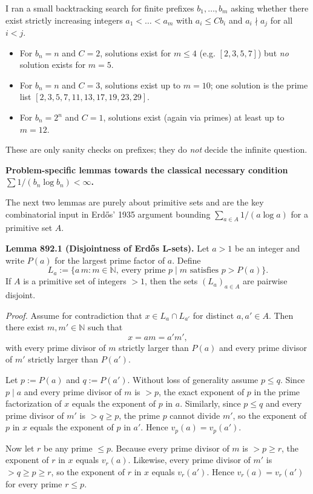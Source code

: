 I ran a small backtracking search for finite prefixes $b_1,\dots,b_m$ asking
whether there exist strictly increasing integers $a_1<\dots<a_m$ with
$a_i\le C b_i$ and $a_i\nmid a_j$ for all $i<j$.

\begin{itemize}
\item For $b_n=n$ and $C=2$, solutions exist for $m\le 4$ (e.g.
$[2,3,5,7]$) but \emph{no} solution exists for $m=5$.
\item For $b_n=n$ and $C=3$, solutions exist up to $m=10$;
one solution is the prime list $[2,3,5,7,11,13,17,19,23,29]$.
\item For $b_n=2^n$ and $C=1$, solutions exist (again via primes) at least up to
$m=12$.
\end{itemize}

These are only sanity checks on prefixes; they do \emph{not} decide the infinite
question.

\medskip
\textbf{Problem-specific lemmas towards the classical necessary condition
$\sum 1/(b_n\log b_n)<\infty$.}

The next two lemmas are purely about primitive sets and are the key combinatorial
input in Erd\H{o}s’ 1935 argument bounding
$\sum_{a\in A} 1/(a\log a)$ for a primitive set $A$.

\medskip
\noindent\textbf{Lemma 892.1 (Disjointness of Erd\H{o}s L-sets).}
Let $a>1$ be an integer and write $P(a)$ for the largest prime factor of $a$.
Define
\[
L_a := \{ a\,m : m\in\mathbb{N},\ \text{every prime }p\mid m \text{ satisfies } p>P(a)\}.
\]
If $A$ is a primitive set of integers $>1$, then the sets $(L_a)_{a\in A}$ are
pairwise disjoint.

\emph{Proof.}
Assume for contradiction that $x\in L_a\cap L_{a'}$ for distinct $a,a'\in A$.
Then there exist $m,m'\in\mathbb{N}$ such that
\[ x = a m = a' m', \]
with every prime divisor of $m$ strictly larger than $P(a)$ and every prime
divisor of $m'$ strictly larger than $P(a')$.

Let $p:=P(a)$ and $q:=P(a')$. Without loss of generality assume $p\le q$.
Since $p\mid a$ and every prime divisor of $m$ is $>p$, the exact exponent of $p$
in the prime factorization of $x$ equals the exponent of $p$ in $a$.
Similarly, since $p\le q$ and every prime divisor of $m'$ is $>q\ge p$, the prime
$p$ cannot divide $m'$, so the exponent of $p$ in $x$ equals the exponent of $p$
in $a'$.
Hence $v_p(a)=v_p(a')$.

Now let $r$ be any prime $\le p$.
Because every prime divisor of $m$ is $>p\ge r$, the exponent of $r$ in $x$ equals
$v_r(a)$. Likewise, every prime divisor of $m'$ is $>q\ge p\ge r$, so the exponent
of $r$ in $x$ equals $v_r(a')$. Hence $v_r(a)=v_r(a')$ for every prime $r\le p$.

